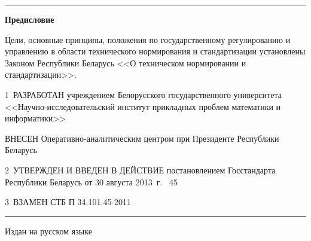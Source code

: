 \vskip0.5mm

\hrule

\rule{0pt}{5mm}

\centerline{\bf Предисловие} 

Цели, основные принципы, положения по государственному регулированию и 
управлению в области технического нормирования и стандартизации 
установлены Законом Республики Беларусь <<О техническом нормировании и 
стандартизации>>.  

\vskip0.2cm

1~РАЗРАБОТАН учреждением Белорусского государственного университета 
<<Науч\-но-исследовательский  институт прикладных проблем математики и 
информатики>> 

ВНЕСЕН Оперативно-аналитическим центром при Президенте Республики Беларусь 

2~УТВЕРЖДЕН И ВВЕДЕН В ДЕЙСТВИЕ постановлением Госстандарта Республики 
Беларусь от 30 августа 2013~г. \No~45

3~ВЗАМЕН СТБ П 34.101.45-2011

\vfill
\hrule
\vskip1mm
Издан на русском языке

\pagebreak
